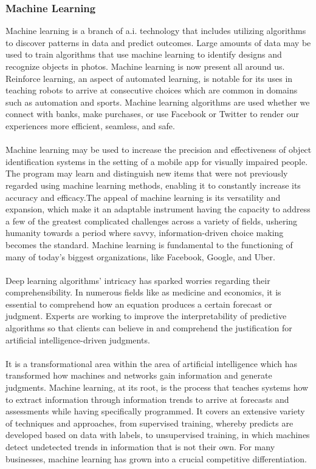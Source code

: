 \documentclass[MScCS]{uccthesis}
\begin{document}
\subsubsection{Machine Learning}
Machine learning is a branch of a.i. technology that includes utilizing algorithms to discover patterns in data and predict outcomes. Large amounts of data may be used to train algorithms that use machine learning to identify designs and recognize objects in photos. Machine learning is now present all around us. Reinforce learning, an aspect of automated learning, is notable for its uses in teaching robots to arrive at consecutive choices which are common in domains such as automation and sports. Machine learning algorithms are used whether we connect with banks, make purchases, or use Facebook or Twitter to render our experiences more efficient, seamless, and safe.\\
\\Machine learning may be used to increase the precision and effectiveness of object identification systems in the setting of a mobile app for visually impaired people. The program may learn and distinguish new items that were not previously regarded using machine learning methods, enabling it to constantly increase its accuracy and efficacy.The appeal of machine learning is its versatility and expansion, which make it an adaptable instrument having the capacity to address a few of the greatest complicated challenges across a variety of fields, ushering humanity towards a period where savvy, information-driven choice making becomes the standard. Machine learning is fundamental to the functioning of many of today's biggest organizations, like Facebook, Google, and Uber. \\
\\Deep learning algorithms' intricacy has sparked worries regarding their comprehensibility. In numerous fields like as medicine and economics, it is essential to comprehend how an equation produces a certain forecast or judgment. Experts are working to improve the interpretability of predictive algorithms so that clients can believe in and comprehend the justification for artificial intelligence-driven judgments.\\
\\It is a transformational area within the area of artificial intelligence which has transformed how machines and networks gain information and generate judgments. Machine learning, at its root, is the process that teaches systems how to extract information through information trends to arrive at forecasts and assessments while having specifically programmed. It covers an extensive variety of techniques and approaches, from supervised training, whereby predicts are developed based on data with labels, to unsupervised training, in which machines detect undetected trends in information that is not their own. For many businesses, machine learning has grown into a crucial competitive differentiation.\\
\end{document}

